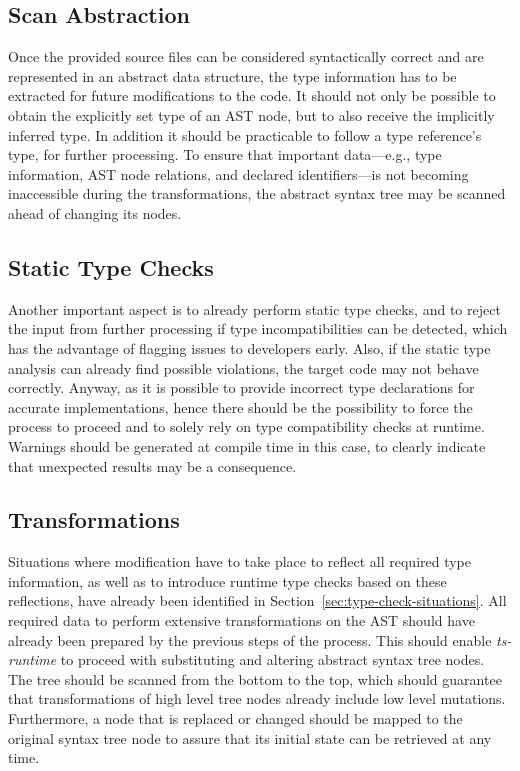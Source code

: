 \subsection{Scan Abstraction}

Once the provided source files can be considered syntactically correct and are represented in an abstract data structure, the type information has to be extracted for future modifications to the code. It should not only be possible to obtain the explicitly set type of an AST node, but to also receive the implicitly inferred type. In addition it should be practicable to follow a type reference's type, for further processing. To ensure that important data---e.g., type information, AST node relations, and declared identifiers---is not becoming inaccessible during the transformations, the abstract syntax tree may be scanned ahead of changing its nodes.

\subsection{Static Type Checks}

Another important aspect is to already perform static type checks, and to reject the input from further processing if type incompatibilities can be detected, which has the advantage of flagging issues to developers early. Also, if the static type analysis can already find possible violations, the target code may not behave correctly. Anyway, as it is possible to provide incorrect type declarations for accurate implementations, hence there should be the possibility to force the process to proceed and to solely rely on type compatibility checks at runtime. Warnings should be generated at compile time in this case, to clearly indicate that unexpected results may be a consequence.

\subsection{Transformations}

Situations where modification have to take place to reflect all required type information, as well as to introduce runtime type checks based on these reflections, have already been identified in Section~\ref{sec:type-check-situations}. All required data to perform extensive transformations on the AST should have already been prepared by the previous steps of the process. This should enable \emph{ts-runtime} to proceed with substituting and altering abstract syntax tree nodes. The tree should be scanned from the bottom to the top, which should guarantee that transformations of high level tree nodes already include low level mutations. Furthermore, a node that is replaced or changed should be mapped to the original syntax tree node to assure that its initial state can be retrieved at any time.

